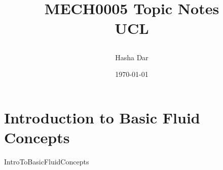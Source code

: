 \documentclass[12pt,a4paper, twoside]{report}
\begin{document}
\title{
  {MECH0005 Topic Notes}\\
  {\large UCL}
  \author{Hasha Dar}
  \date{\today}
}
\maketitle

\tableofcontents
\chapter{Introduction to Basic Fluid Concepts}
{IntroToBasicFluidConcepts}
\end{document}
